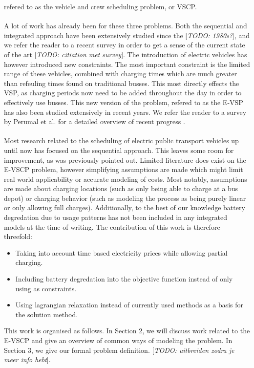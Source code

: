 \documentclass[ht]{article}
\newcommand{\todo}[1]{{\color{red}[\textit{TODO: #1}]}}
\begin{document}
refered to as the vehicle and crew scheduling problem, or VSCP. \\\\ A lot of
work has already been for these three problems. Both the sequential and
integrated approach have been extensively studied since the \todo{1980s?}, and
we refer the reader to a recent survey in order to get a sense of the current
state of the art \todo{citiation met survey}. The introduction of electric
vehicles has however introduced new constraints. The most important constraint
is the limited range of these vehicles, combined with charging times which are
much greater than refeuling times found on traditional busses. This most
directly effects the VSP, as charging periods now need to be added throughout
the day in order to effectively use busses. This new version of the problem,
refered to as the E-VSP has also been studied extensively in recent years. We
refer the reader to a survey by Perumal et al. for a detailed overview of
recent progress \cite{Perumal2022LitRev}. \\\\ Most research related to the
scheduling of electric public transport vehicles up until now has focused on
the sequential approach. This leaves some room for improvement, as was
previously pointed out. Limited literature does exist on the E-VSCP problem,
however simplifying assumptions are made which might limit real world
applicability or accurate modeling of costs. Most notably, assumptions are made
about charging locations (such as only being able to charge at a bus depot) or
charging behavior (such as modeling the process as being purely linear or only
allowing full charges). Additionally, to the best of our knowledge battery
degredation due to usage patterns has not been included in any integrated
models at the time of writing. The contribution of this work is therefore
threefold:
\begin{itemize}
  \item Taking into account time based electricity prices while allowing partial
        charging.
  \item Including battery degredation into the objective function instead of only using
        as constraints.
  \item Using lagrangian relaxation instead of currently used methods as a basis for
        the solution method.
\end{itemize}
This work is organised as follows. In Section 2, we will discuss work related to the E-VSCP and give an overview of common ways of modeling the problem. In Section 3, we give our formal problem definition. \todo{uitbreiden zodra je meer info hebt}.
\end{document}
